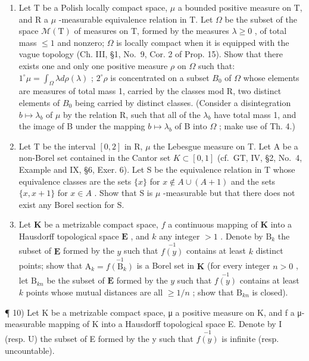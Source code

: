\begin{enumerate}
\item
  Let T be a Polish locally compact space, \(\mu\) a bounded positive measure on T, and R a \(\mu\) -measurable equivalence relation in T. Let \(\Omega\) be the subset of the space \(\mathcal{M}(\mathrm{T})\) of measures on T, formed by the measures \(\lambda \geqslant 0\) , of total mass \(\leqslant 1\) and nonzero; \(\Omega\) is locally compact when it is equipped with the vague topology (Ch. III, §1, No.~9, Cor. 2 of Prop. 15). Show that there exists one and only one positive measure \(\rho\) on \(\Omega\) such that: \(1^{\circ} \mu = \int_{\Omega} \lambda d\rho(\lambda)\) ; \(2^{\circ} \rho\) is concentrated on a subset \(B_{0}\) of \(\Omega\) whose elements are measures of total mass 1, carried by the classes mod R, two distinct elements of \(B_{0}\) being carried by distinct classes. (Consider a disintegration \(b \mapsto \lambda_{b}\) of \(\mu\) by the relation R, such that all of the \(\lambda_{b}\) have total mass 1, and the image of B under the mapping \(b \mapsto \lambda_{b}\) of B into \(\Omega\) ; make use of Th. 4.)
\item
  Let T be the interval \([0,2]\) in R, \(\mu\) the Lebesgue measure on T. Let A be a non-Borel set contained in the Cantor set \(K \subset [0,1]\) (cf.~GT, IV, §2, No.~4, Example and IX, §6, Exer. 6). Let S be the equivalence relation in T whose equivalence classes are the sets \(\{x\}\) for \(x \notin A \cup (A + 1)\) and the sets \(\{x, x + 1\}\) for \(x \in A\) . Show that S is \(\mu\) -measurable but that there does not exist any Borel section for S.
\item
  Let \(\mathbf{K}\) be a metrizable compact space, \(f\) a continuous mapping of \(\mathbf{K}\) into a Hausdorff topological space \(\mathbf{E}\) , and \(k\) any integer \(> 1\) . Denote by \(\mathrm{B}_k\) the subset of \(\mathbf{E}\) formed by the \(y\) such that \(\stackrel{-1}{f(y)}\) contains at least \(k\) distinct points; show that \(\mathrm{A}_k = \stackrel{-1}{f(\mathrm{B}_k)}\) is a Borel set in \(\mathbf{K}\) (for every integer \(n > 0\) , let \(\mathrm{B}_{kn}\) be the subset of \(\mathbf{E}\) formed by the \(y\) such that \(\stackrel{-1}{f(y)}\) contains at least \(k\) points whose mutual distances are all \(\geqslant 1/n\) ; show that \(\mathrm{B}_{kn}\) is closed).
\end{enumerate}

¶ 10) Let K be a metrizable compact space, μ a positive measure on K, and f a μ-measurable mapping of K into a Hausdorff topological space E. Denote by I (resp. U) the subset of E formed by the y such that \(\stackrel{-1}{f(y)}\) is infinite (resp. uncountable).

